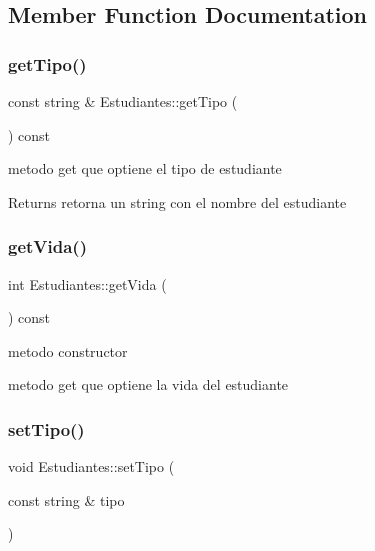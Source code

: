 \subsection{Member Function Documentation}
\mbox{\label{classEstudiantes_a53ae5b8458793626eb820538a5862edd}} 
\subsubsection{\texorpdfstring{get\+Tipo()}{getTipo()}}
{\footnotesize\ttfamily const string \& Estudiantes\+::get\+Tipo (\begin{DoxyParamCaption}{ }\end{DoxyParamCaption}) const}



metodo get que optiene el tipo de estudiante 

\begin{DoxyReturn}{Returns}
retorna un string con el nombre del estudiante 
\end{DoxyReturn}
\mbox{\label{classEstudiantes_aeda64563ecb0ff1d54f848fcd75475b4}} 
\subsubsection{\texorpdfstring{get\+Vida()}{getVida()}}
{\footnotesize\ttfamily int Estudiantes\+::get\+Vida (\begin{DoxyParamCaption}{ }\end{DoxyParamCaption}) const}



metodo constructor 

metodo get que optiene la vida del estudiante \mbox{\label{classEstudiantes_ab2a2cbcdd7be2b8af8aadaca3c641aca}} 
\subsubsection{\texorpdfstring{set\+Tipo()}{setTipo()}}
{\footnotesize\ttfamily void Estudiantes\+::set\+Tipo (\begin{DoxyParamCaption}\item[{const string \&}]{tipo }\end{DoxyParamCaption})}



